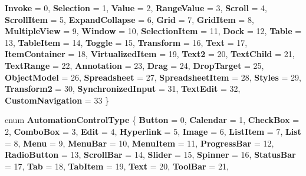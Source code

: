 \begin{DoxyCompactItemize}
{\bfseries Invoke} = 0, 
{\bfseries Selection} = 1, 
{\bfseries Value} = 2, 
{\bfseries Range\+Value} = 3, 
\newline
{\bfseries Scroll} = 4, 
{\bfseries Scroll\+Item} = 5, 
{\bfseries Expand\+Collapse} = 6, 
{\bfseries Grid} = 7, 
\newline
{\bfseries Grid\+Item} = 8, 
{\bfseries Multiple\+View} = 9, 
{\bfseries Window} = 10, 
{\bfseries Selection\+Item} = 11, 
\newline
{\bfseries Dock} = 12, 
{\bfseries Table} = 13, 
{\bfseries Table\+Item} = 14, 
{\bfseries Toggle} = 15, 
\newline
{\bfseries Transform} = 16, 
{\bfseries Text} = 17, 
{\bfseries Item\+Container} = 18, 
{\bfseries Virtualized\+Item} = 19, 
\newline
{\bfseries Text2} = 20, 
{\bfseries Text\+Child} = 21, 
{\bfseries Text\+Range} = 22, 
{\bfseries Annotation} = 23, 
\newline
{\bfseries Drag} = 24, 
{\bfseries Drop\+Target} = 25, 
{\bfseries Object\+Model} = 26, 
{\bfseries Spreadsheet} = 27, 
\newline
{\bfseries Spreadsheet\+Item} = 28, 
{\bfseries Styles} = 29, 
{\bfseries Transform2} = 30, 
{\bfseries Synchronized\+Input} = 31, 
\newline
{\bfseries Text\+Edit} = 32, 
{\bfseries Custom\+Navigation} = 33
 \}
\item 
\mbox{\label{namespace_windows_1_1_u_i_1_1_xaml_1_1_automation_1_1_peers_a545d04e5cb3e01155ab597d749495a0f}} 
enum {\bfseries Automation\+Control\+Type} \{ \newline
{\bfseries Button} = 0, 
{\bfseries Calendar} = 1, 
{\bfseries Check\+Box} = 2, 
{\bfseries Combo\+Box} = 3, 
\newline
{\bfseries Edit} = 4, 
{\bfseries Hyperlink} = 5, 
{\bfseries Image} = 6, 
{\bfseries List\+Item} = 7, 
\newline
{\bfseries List} = 8, 
{\bfseries Menu} = 9, 
{\bfseries Menu\+Bar} = 10, 
{\bfseries Menu\+Item} = 11, 
\newline
{\bfseries Progress\+Bar} = 12, 
{\bfseries Radio\+Button} = 13, 
{\bfseries Scroll\+Bar} = 14, 
{\bfseries Slider} = 15, 
\newline
{\bfseries Spinner} = 16, 
{\bfseries Status\+Bar} = 17, 
{\bfseries Tab} = 18, 
{\bfseries Tab\+Item} = 19, 
\newline
{\bfseries Text} = 20, 
{\bfseries Tool\+Bar} = 21, 

\end{DoxyCompactItemize}
